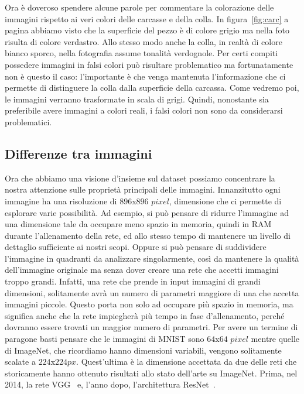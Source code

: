 Ora è doveroso spendere alcune parole per commentare la colorazione delle immagini rispetto ai veri colori delle carcasse e della colla.
In figura~\ref{fig:carc} a pagina \pageref{fig:carc} abbiamo visto che la superficie del pezzo è di colore grigio ma nella foto risulta di colore verdastro.
Allo stesso modo anche la colla, in realtà di colore bianco sporco, nella fotografia assume tonalità verdognole.
Per certi compiti possedere immagini in falsi colori può risultare problematico ma fortunatamente non è questo il caso: l'importante è che venga mantenuta l'informazione che ci permette di distinguere la colla dalla superficie della carcassa.
Come vedremo poi, le immagini verranno trasformate in scala di grigi.
Quindi, nonostante sia preferibile avere immagini a colori reali, i falsi colori non sono da considerarsi problematici.

\subsection{Differenze tra immagini}
Ora che abbiamo una visione d'insieme sul dataset possiamo concentrare la nostra attenzione sulle proprietà principali delle immagini.
Innanzitutto ogni immagine ha una risoluzione di $896$x$896$ $pixel$, dimensione che ci permette di esplorare varie possibilità.
Ad esempio, si può pensare di ridurre l'immagine ad una dimensione tale da occupare meno spazio in memoria, quindi in RAM durante l'allenamento della rete, ed allo stesso tempo di mantenere un livello di dettaglio sufficiente ai nostri scopi.
Oppure si può pensare di suddividere l'immagine in quadranti da analizzare singolarmente, così da mantenere la qualità dell'immagine originale ma senza dover creare una rete che accetti immagini troppo grandi.
Infatti, una rete che prende in input immagini di grandi dimensioni, solitamente avrà un numero di parametri maggiore di una che accetta immagini piccole.
Questo porta non solo ad occupare più spazio in memoria, ma significa anche che la rete impiegherà più tempo in fase d'allenamento, perché dovranno essere trovati un maggior numero di parametri.
Per avere un termine di paragone basti pensare che le immagini di MNIST sono $64$x$64$ $pixel$ mentre quelle di ImageNet, che ricordiamo hanno dimensioni variabili, vengono solitamente scalate a $224$x$224px$.
Quest'ultima è la dimensione accettata da due delle reti che storicamente hanno ottenuto risultati allo stato dell'arte su ImageNet.
Prima, nel 2014, la rete VGG~\cite{vgg} e, l'anno dopo, l'architettura ResNet~\cite{resnet}.

